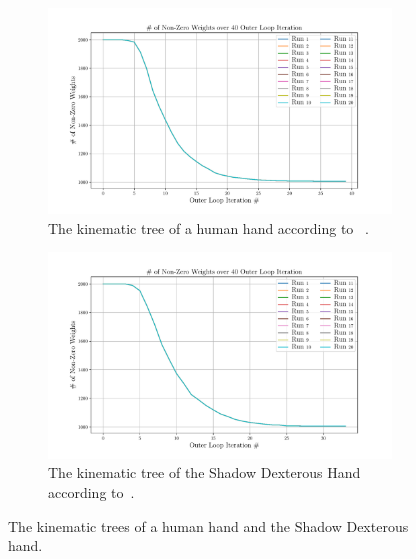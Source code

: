 \begin{figure}[!h]
	\centering
	\begin{subfigure}[b]{0.48\textwidth}
		\centering
		\includegraphics[width=\textwidth]{chapters/2-pose-estimation/fig/GNC-TLS-w-run-70-conv.pdf}
		\caption{The kinematic tree of a human hand according to~\cite{grasp-synthesis-algorithms-for-multifingered-robot-hands} \newline.}
		\label{app:GNC-TLS-w-run-70-conv}
	\end{subfigure}
	\hfill
	\begin{subfigure}[b]{0.48\textwidth}
		\centering
		\includegraphics[width=\textwidth]{chapters/2-pose-estimation/fig/GNC-TLS-w-run-80-conv.pdf}
		\caption{The kinematic tree of the Shadow Dexterous Hand according to~\cite{robot-hand-kinematics}. \newline}
		\label{app:GNC-TLS-w-run-80-conv}
	\end{subfigure}
	\caption{The kinematic trees of a human hand and the Shadow Dexterous hand.}
	\label{app:GNC-TLS-w-run-70-80-conv}
\end{figure}

